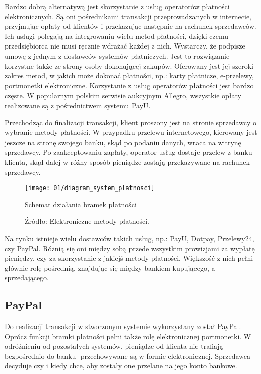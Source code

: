 Bardzo dobrą alternatywą jest skorzystanie z usług operatorów płatności elektronicznych. Są oni pośrednikami transakcji przeprowadzanych w internecie, przyjmując opłaty od klientów i przekazując następnie na rachunek sprzedawców. Ich usługi polegają na integrowaniu wielu metod płatności, dzięki czemu przedsiębiorca nie musi ręcznie wdrażać każdej z nich. Wystarczy, że podpisze umowę z jednym z dostawców systemów płatniczych. Jest to rozwiązanie korzystne także ze strony osoby dokonującej zakupów. Oferowany jest jej szeroki zakres metod, w jakich może dokonać płatności, np.: karty płatnicze, e-przelewy, portmonetki elektroniczne. Korzystanie z usług operatorów płatności jest bardzo częste. W popularnym polskim serwisie aukcyjnym Allegro, wszystkie opłaty realizowane są z pośrednictwem systemu PayU.

Przechodząc do finalizacji transakcji, klient proszony jest na stronie sprzedawcy o wybranie metody płatności. W przypadku przelewu internetowego, kierowany jest jeszcze na stronę swojego banku, skąd po podaniu danych, wraca na witrynę sprzedawcy. Po zaakceptowaniu zapłaty, operator usług dostaje przelew z banku klienta, skąd dalej w różny sposób pieniądze zostają przekazywane na rachunek sprzedawcy.

\begin{figure}[h]
	\begin{center}
		\texttt{[image: 01/diagram\_system\_platnosci]}
	\end{center}
	\caption{Schemat działania bramek płatności}
	\vspace{-0.4cm}
	\caption*{Źródło: Elektroniczne metody płatności. \cite{elektroniczne_metody_platnosci}}
\end{figure}

Na rynku istnieje wielu dostawców takich usług, np.: PayU, Dotpay, Przelewy24, czy PayPal. Różnią się oni między sobą przede wszystkim prowizjami za wypłatę pieniędzy, czy za skorzystanie z jakiejś metody płatności. Większość z nich pełni głównie rolę pośrednią, znajdując się między bankiem kupującego, a sprzedającego. 

\subsection{PayPal}

Do realizacji transakcji w stworzonym systemie wykorzystany został PayPal. Oprócz funkcji bramki płatności pełni także rolę elektronicznej portmonetki. W odróżnieniu od pozostałych systemów, pieniądze od klienta nie trafiają bezpośrednio do banku -przechowywane są w formie elektronicznej. Sprzedawca decyduje czy i kiedy chce, aby zostały one przelane na jego konto bankowe.

